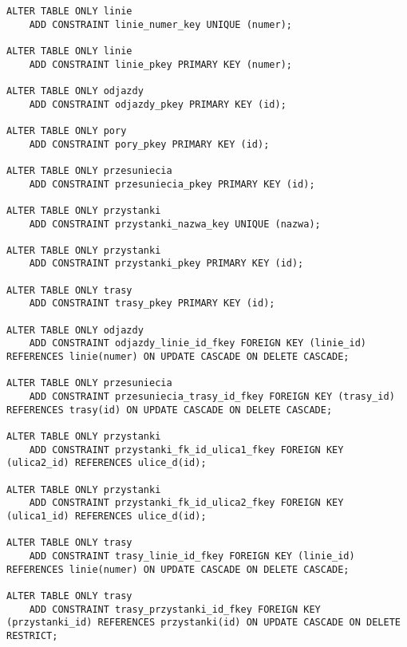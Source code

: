 \begin{verbatim}
ALTER TABLE ONLY linie
    ADD CONSTRAINT linie_numer_key UNIQUE (numer);

ALTER TABLE ONLY linie
    ADD CONSTRAINT linie_pkey PRIMARY KEY (numer);

ALTER TABLE ONLY odjazdy
    ADD CONSTRAINT odjazdy_pkey PRIMARY KEY (id);

ALTER TABLE ONLY pory
    ADD CONSTRAINT pory_pkey PRIMARY KEY (id);

ALTER TABLE ONLY przesuniecia
    ADD CONSTRAINT przesuniecia_pkey PRIMARY KEY (id);

ALTER TABLE ONLY przystanki
    ADD CONSTRAINT przystanki_nazwa_key UNIQUE (nazwa);

ALTER TABLE ONLY przystanki
    ADD CONSTRAINT przystanki_pkey PRIMARY KEY (id);

ALTER TABLE ONLY trasy
    ADD CONSTRAINT trasy_pkey PRIMARY KEY (id);

ALTER TABLE ONLY odjazdy
    ADD CONSTRAINT odjazdy_linie_id_fkey FOREIGN KEY (linie_id) REFERENCES linie(numer) ON UPDATE CASCADE ON DELETE CASCADE;

ALTER TABLE ONLY przesuniecia
    ADD CONSTRAINT przesuniecia_trasy_id_fkey FOREIGN KEY (trasy_id) REFERENCES trasy(id) ON UPDATE CASCADE ON DELETE CASCADE;

ALTER TABLE ONLY przystanki
    ADD CONSTRAINT przystanki_fk_id_ulica1_fkey FOREIGN KEY (ulica2_id) REFERENCES ulice_d(id);

ALTER TABLE ONLY przystanki
    ADD CONSTRAINT przystanki_fk_id_ulica2_fkey FOREIGN KEY (ulica1_id) REFERENCES ulice_d(id);

ALTER TABLE ONLY trasy
    ADD CONSTRAINT trasy_linie_id_fkey FOREIGN KEY (linie_id) REFERENCES linie(numer) ON UPDATE CASCADE ON DELETE CASCADE;

ALTER TABLE ONLY trasy
    ADD CONSTRAINT trasy_przystanki_id_fkey FOREIGN KEY (przystanki_id) REFERENCES przystanki(id) ON UPDATE CASCADE ON DELETE RESTRICT;
\end{verbatim}



